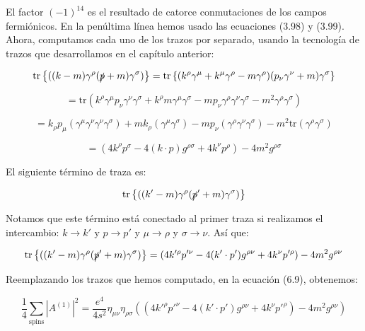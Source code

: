   El factor $(-1)^{14}$ es el resultado de catorce conmutaciones de los campos fermiónicos. En la penúltima línea hemos usado las ecuaciones (3.98) y (3.99). Ahora, computamos cada uno de los trazos por separado, usando la tecnología de trazos que desarrollamos en el capítulo anterior:

\begin{equation}
\text{tr} \left\{ ((k - m) \gamma^\rho (\slashed{p} + m) \gamma^\sigma) \right\} = \text{tr} \left\{ (k^\rho \gamma^\mu + k^\mu \gamma^\rho - m \gamma^\rho)(p_\nu \gamma^\nu + m) \gamma^\sigma \right\}
\end{equation}

\begin{equation}
= \text{tr}(k^\rho \gamma^\mu p_\nu \gamma^\nu \gamma^\sigma + k^\rho m \gamma^\mu \gamma^\sigma - m p_\nu \gamma^\rho \gamma^\nu \gamma^\sigma - m^2 \gamma^\rho \gamma^\sigma)
\end{equation}

\begin{equation}
= k_\rho p_\mu (\gamma^\mu \gamma^\nu \gamma^\nu \gamma^\sigma) + m k_\rho (\gamma^\mu \gamma^\sigma) - m p_\nu (\gamma^\rho \gamma^\nu \gamma^\sigma) - m^2 \text{tr}(\gamma^\rho \gamma^\sigma)
\end{equation}

\begin{equation}
= (4k^\rho p^\sigma - 4(k \cdot p)g^{\rho\sigma} + 4k^\nu p^\rho) - 4m^2 g^{\rho\sigma}
\end{equation}

El siguiente término de traza es:

\begin{equation}
\text{tr} \left\{ ((k' - m) \gamma^\rho (\slashed{p}' + m) \gamma^\sigma) \right\}
\end{equation}

Notamos que este término está conectado al primer traza si realizamos el intercambio: $ k \to k' $ y $ p \to p' $ y $ \mu \to \rho $ y $ \sigma \to \nu $. Así que:

\begin{equation}
\text{tr} \left\{ ((k' - m) \gamma^\rho (\slashed{p}' + m) \gamma^\sigma) \right\} = (4k'^\rho p'^\nu - 4(k' \cdot p')g^{\rho\nu} + 4k^\nu p'^\rho) - 4m^2 g^{\rho\nu}
\end{equation}

Reemplazando los trazos que hemos computado, en la ecuación (6.9), obtenemos:

\begin{equation}
\frac{1}{4} \sum_{\text{spins}} |A^{(1)}|^2 = \frac{e^4}{4s^2} \eta_{\mu\nu} \eta_{\rho\sigma} ((4k'^\rho p'^\nu - 4(k' \cdot p')g^{\rho\nu} + 4k^\nu p'^\rho) - 4m^2 g^{\rho\nu})
\end{equation}

